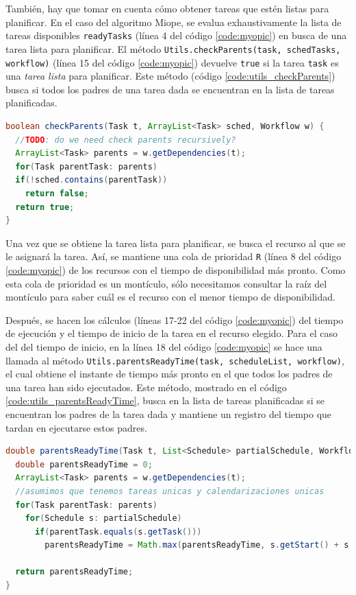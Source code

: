 También, hay que tomar en cuenta cómo obtener tareas que estén listas para planificar. En el caso del algoritmo Miope, se evalua exhaustivamente la lista de tareas disponibles \texttt{readyTasks} (línea 4 del código \ref{code:myopic}) en busca de una tarea lista para planificar. El método \texttt{Utils.checkParents(task, schedTasks, workflow)} (línea 15 del código \ref{code:myopic}) devuelve \texttt{true} si la tarea \texttt{task} es una \emph{tarea lista} para planificar. Este método (código \ref{code:utils_checkParents}) busca si todos los padres de una tarea dada se encuentran en la lista de tareas planificadas.

\begin{lstlisting}[language=java,label={code:utils_checkParents},caption={Método que verifica si los padres de una tarea están planificados.},float]
boolean checkParents(Task t, ArrayList<Task> sched, Workflow w) {
  //TODO: do we need check parents recursively?
  ArrayList<Task> parents = w.getDependencies(t);
  for(Task parentTask: parents)
  if(!sched.contains(parentTask))
    return false;
  return true;
}
\end{lstlisting}

Una vez que se obtiene la tarea lista para planificar, se busca el recurso al que se le asignará la tarea. Así, se mantiene una cola de prioridad \texttt{R} (línea 8 del código \ref{code:myopic}) de los recursos con el tiempo de disponibilidad más pronto. Como esta cola de prioridad es un montículo, sólo necesitamos consultar la raíz del montículo para saber cuál es el recurso con el menor tiempo de disponibilidad. 

Después, se hacen los cálculos (líneas 17-22 del código \ref{code:myopic}) del tiempo de ejecución y el tiempo de inicio de la tarea en el recurso elegido. Para el caso del del tiempo de inicio, en la línea 18 del código \ref{code:myopic} se hace una llamada al método \texttt{Utils.parentsReadyTime(task, scheduleList, workflow)}, el cual obtiene el instante de tiempo más pronto en el que todos los padres de una tarea han sido ejecutados. Este método, mostrado en el código \ref{code:utils_parentsReadyTime}, busca en la lista de tareas planificadas si se encuentran los padres de la tarea dada y mantiene un registro del tiempo que tardan en ejecutarse estos padres.

\begin{lstlisting}[language=java,label={code:utils_parentsReadyTime},caption={Método que calcula el tiempo mínimo en el que los padres de una tarea dada han sido ejecutados.},float]
double parentsReadyTime(Task t, List<Schedule> partialSchedule, Workflow w) {
  double parentsReadyTime = 0;
  ArrayList<Task> parents = w.getDependencies(t);
  //asumimos que tenemos tareas unicas y calendarizaciones unicas
  for(Task parentTask: parents)
    for(Schedule s: partialSchedule)
      if(parentTask.equals(s.getTask()))
        parentsReadyTime = Math.max(parentsReadyTime, s.getStart() + s.getDuration());

  return parentsReadyTime;
}
\end{lstlisting}

